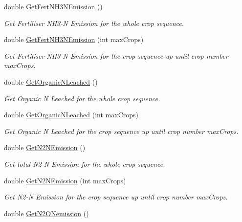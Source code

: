 \begin{DoxyCompactItemize}
double \mbox{\hyperlink{class_crop_sequence_class_ac21baaca5d6be100861bab0428a2b980}{Get\+Fert\+N\+H3\+N\+Emission}} ()
\begin{DoxyCompactList}\small\item\em Get Fertiliser N\+H3-\/N Emission for the whole crop sequence. \end{DoxyCompactList}\item 
double \mbox{\hyperlink{class_crop_sequence_class_af4c2ab1312cb344e0a1e94b3bca0e8e4}{Get\+Fert\+N\+H3\+N\+Emission}} (int max\+Crops)
\begin{DoxyCompactList}\small\item\em Get Fertiliser N\+H3-\/N Emission for the crop sequence up until crop number max\+Crops. \end{DoxyCompactList}\item 
double \mbox{\hyperlink{class_crop_sequence_class_a8e17c89d14a240e2943ea26b4f60c1bd}{Get\+Organic\+N\+Leached}} ()
\begin{DoxyCompactList}\small\item\em Get Organic N Leached for the whole crop sequence. \end{DoxyCompactList}\item 
double \mbox{\hyperlink{class_crop_sequence_class_adcc7d7f3211236c6a93ab34d117f1a25}{Get\+Organic\+N\+Leached}} (int max\+Crops)
\begin{DoxyCompactList}\small\item\em Get Organic N Leached for the crop sequence up until crop number max\+Crops. \end{DoxyCompactList}\item 
double \mbox{\hyperlink{class_crop_sequence_class_adf241517ee886bcd1a918d74bcd4ee11}{Get\+N2\+N\+Emission}} ()
\begin{DoxyCompactList}\small\item\em Get total N2-\/N Emission for the whole crop sequence. \end{DoxyCompactList}\item 
double \mbox{\hyperlink{class_crop_sequence_class_afb3c52e232a44a68f65c7d3a7b67ba70}{Get\+N2\+N\+Emission}} (int max\+Crops)
\begin{DoxyCompactList}\small\item\em Get N2-\/N Emission for the crop sequence up until crop number max\+Crops. \end{DoxyCompactList}\item 
double \mbox{\hyperlink{class_crop_sequence_class_aa009ad2cc519073672c1509ecf34f85e}{Get\+N2\+O\+Nemission}} ()

\end{DoxyCompactItemize}
